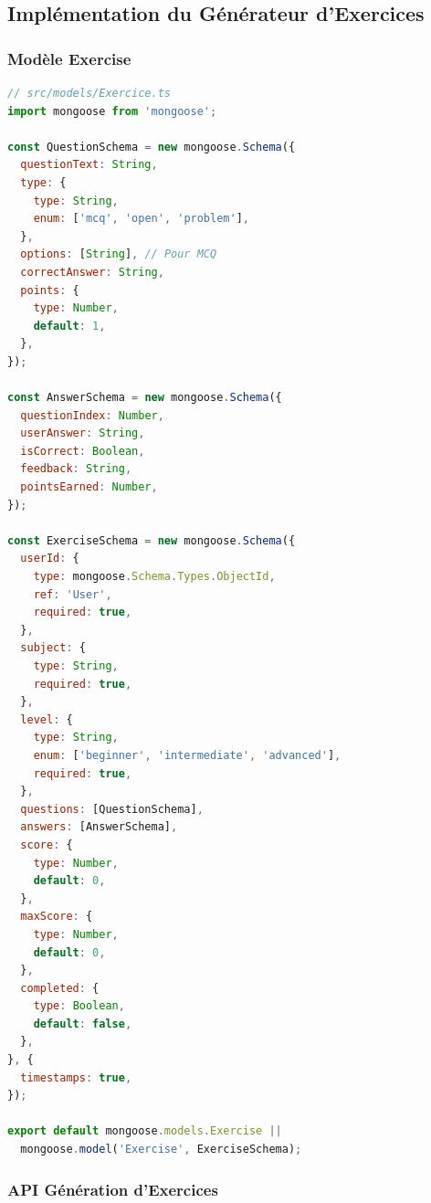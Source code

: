 \subsection{Implémentation du Générateur d'Exercices}

\subsubsection{Modèle Exercise}

\begin{lstlisting}[language=JavaScript, caption=Schéma Mongoose Exercise, label=code:exercise-schema]
// src/models/Exercice.ts
import mongoose from 'mongoose';

const QuestionSchema = new mongoose.Schema({
  questionText: String,
  type: {
    type: String,
    enum: ['mcq', 'open', 'problem'],
  },
  options: [String], // Pour MCQ
  correctAnswer: String,
  points: {
    type: Number,
    default: 1,
  },
});

const AnswerSchema = new mongoose.Schema({
  questionIndex: Number,
  userAnswer: String,
  isCorrect: Boolean,
  feedback: String,
  pointsEarned: Number,
});

const ExerciseSchema = new mongoose.Schema({
  userId: {
    type: mongoose.Schema.Types.ObjectId,
    ref: 'User',
    required: true,
  },
  subject: {
    type: String,
    required: true,
  },
  level: {
    type: String,
    enum: ['beginner', 'intermediate', 'advanced'],
    required: true,
  },
  questions: [QuestionSchema],
  answers: [AnswerSchema],
  score: {
    type: Number,
    default: 0,
  },
  maxScore: {
    type: Number,
    default: 0,
  },
  completed: {
    type: Boolean,
    default: false,
  },
}, {
  timestamps: true,
});

export default mongoose.models.Exercise || 
  mongoose.model('Exercise', ExerciseSchema);
\end{lstlisting}

\subsubsection{API Génération d'Exercices}

